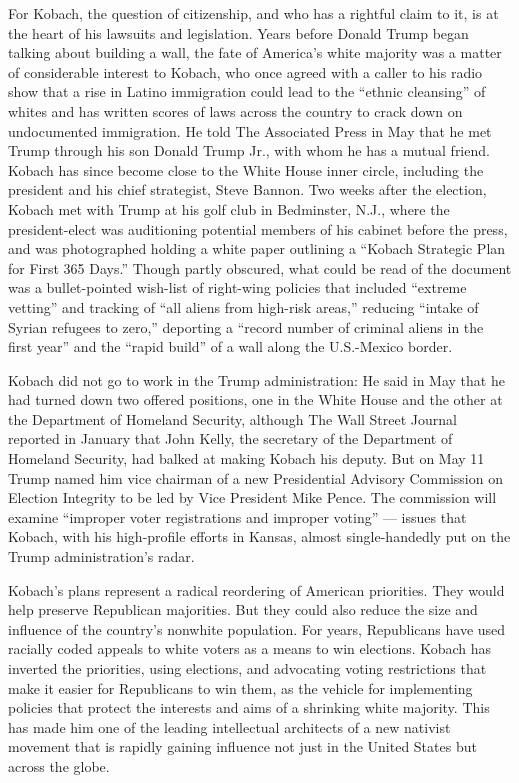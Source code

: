 For Kobach, the question of citizenship, and who has a rightful claim to
it, is at the heart of his lawsuits and legislation. Years before Donald
Trump began talking about building a wall, the fate of America's white
majority was a matter of considerable interest to Kobach, who once
agreed with a caller to his radio show that a rise in Latino immigration
could lead to the ``ethnic cleansing'' of whites and has written scores
of laws across the country to crack down on undocumented immigration. He
told The Associated Press in May that he met Trump through his son
Donald Trump Jr., with whom he has a mutual friend. Kobach has since
become close to the White House inner circle, including the president
and his chief strategist, Steve Bannon. Two weeks after the election,
Kobach met with Trump at his golf club in Bedminster, N.J., where the
president-elect was auditioning potential members of his cabinet before
the press, and was photographed holding a white paper outlining a
``Kobach Strategic Plan for First 365 Days.'' Though partly obscured,
what could be read of the document was a bullet-pointed wish-list of
right-wing policies that included ``extreme vetting'' and tracking of
``all aliens from high-risk areas,'' reducing ``intake of Syrian
refugees to zero,'' deporting a ``record number of criminal aliens in
the first year'' and the ``rapid build'' of a wall along the U.S.-Mexico
border.

Kobach did not go to work in the Trump administration: He said in May
that he had turned down two offered positions, one in the White House
and the other at the Department of Homeland Security, although The Wall
Street Journal reported in January that John Kelly, the secretary of the
Department of Homeland Security, had balked at making Kobach his deputy.
But on May 11 Trump named him vice chairman of a new Presidential
Advisory Commission on Election Integrity to be led by Vice President
Mike Pence. The commission will examine ``improper voter registrations
and improper voting'' --- issues that Kobach, with his high-profile
efforts in Kansas, almost single-handedly put on the Trump
administration's radar.

Kobach's plans represent a radical reordering of American priorities.
They would help preserve Republican majorities. But they could also
reduce the size and influence of the country's nonwhite population. For
years, Republicans have used racially coded appeals to white voters as a
means to win elections. Kobach has inverted the priorities, using
elections, and advocating voting restrictions that make it easier for
Republicans to win them, as the vehicle for implementing policies that
protect the interests and aims of a shrinking white majority. This has
made him one of the leading intellectual architects of a new nativist
movement that is rapidly gaining influence not just in the United States
but across the globe.

